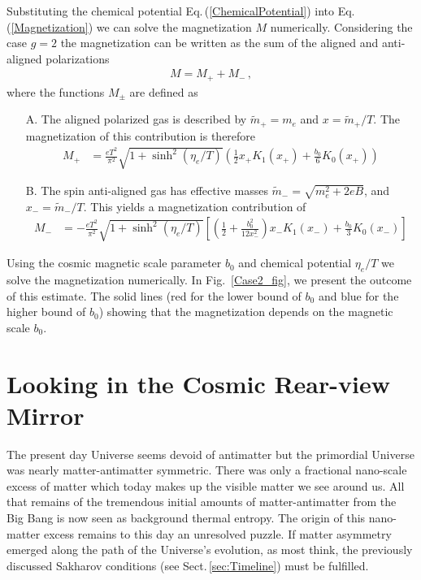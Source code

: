 \documentclass[universe,article,submit,moreauthors,pdftex,a4paper]{Definitions/mdpi}
\newcommand{\req}[1]{Eq.\,(\ref{#1})}
\newcommand*{\rf}[1]{Fig.~{\ref{#1}}}
\newcommand*{\rsec}[1]{Sect.\,{\ref{#1}}}
\newcommand*{\xblue}{\color{black}}
\begin{document}
Substituting the chemical potential \req{ChemicalPotential} into \req{Magnetization} we can solve the magnetization $M$ numerically.
Considering the case $g=2$ the magnetization can be written as the sum of the aligned and anti-aligned polarizations {\xblue
\begin{align}
M=M_{+}+M_{-}\,,
\end{align}
}where the functions $M_\pm$ are defined as 
\begin{itemize}
\item[A.] The aligned polarized gas is described by $\tilde m_+=m_e$ and $x=\tilde m_+/T$. The magnetization of this contribution is therefore
\begin{align}\label{Magnetization_002}
M_{+}&=\frac{eT^{2}}{\pi^2}\sqrt{1+\sinh^2(\eta_e/T)}\left(\frac{1}{2}x_+K_1(x_+)+\frac{b_{0}}{6}K_0(x_+)\right)
\end{align}
\item[B.] The spin anti-aligned gas has effective masses $\tilde m_-=\sqrt{m^2_e+2eB}$, and $x_-=\tilde m_-/T$. This yields a magnetization contribution of
\begin{align}\label{Magnetization_001}
M_{-}&=-\frac{eT^{2}}{\pi^2}\sqrt{1+\sinh^2(\eta_e/T)}\left[\left(\frac{1}{2}+\frac{b_{0}^{2}}{12x_-^2}\right)x_-K_1(x_-)+\frac{b_{0}}{3}K_0(x_-)\right]
\end{align}
\end{itemize}
Using the cosmic magnetic scale parameter $b_0$ and chemical potential $\eta_e/T$ we solve the magnetization numerically. In \rf{Case2_fig}, {\xblue we present the outcome of this estimate. The solid lines (red for the lower bound of $b_{0}$ and blue for the higher bound of $b_{0}$) showing that the magnetization depends on the magnetic scale $b_0$.}

\section{Looking in the Cosmic Rear-view Mirror}\label{sec:Summary}
\noindent The present day Universe seems devoid of antimatter but the primordial Universe was nearly matter-antimatter symmetric. There was only a fractional nano-scale excess of matter which today makes up the visible matter we see around us. All that remains of the tremendous initial amounts of matter-antimatter from the Big Bang is now seen as background thermal entropy. The origin of this nano-matter excess remains to this day an unresolved puzzle. If matter asymmetry emerged along the path of the Universe's evolution, as most think, the previously discussed Sakharov conditions (see \rsec{sec:Timeline}) must be fulfilled.
\end{document}
